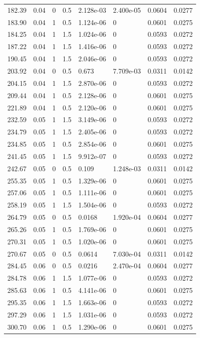 \documentclass[preview]{standalone}
\begin{document}
{{\begin{tabular}{L{1.2cm}C{1.2cm} C{0.3cm}C{0.5cm} C{1.4cm}C{1.4cm} C{1.4cm}C{1.4cm}}
  182.39  &  0.04  & 0     & 0.5 &  2.128e-03  & 2.400e-05  & 0.0604 &  0.0277   \\ 
  183.90  &  0.04  & 1     & 0.5 &  1.124e-06  & 0  & 0.0601 &  0.0275   \\ 
  184.25  &  0.04  & 1     & 1.5 &  1.024e-06  & 0  & 0.0593 &  0.0272   \\ 
  187.22  &  0.04  & 1     & 1.5 &  1.416e-06  & 0  & 0.0593 &  0.0272   \\ 
  190.45  &  0.04  & 1     & 1.5 &  2.046e-06  & 0  & 0.0593 &  0.0272   \\ 
  203.92  &  0.04  & 0     & 0.5 &  0.673  & 7.709e-03  & 0.0311 &  0.0142   \\ 
  204.15  &  0.04  & 1     & 1.5 &  2.870e-06  & 0  & 0.0593 &  0.0272   \\ 
  209.44  &  0.04  & 1     & 0.5 &  2.128e-06  & 0  & 0.0601 &  0.0275   \\ 
  221.89  &  0.04  & 1     & 0.5 &  2.120e-06  & 0  & 0.0601 &  0.0275   \\ 
  232.59  &  0.05  & 1     & 1.5 &  3.149e-06  & 0  & 0.0593 &  0.0272   \\ 
  234.79  &  0.05  & 1     & 1.5 &  2.405e-06  & 0  & 0.0593 &  0.0272   \\ 
  234.85  &  0.05  & 1     & 0.5 &  2.854e-06  & 0  & 0.0601 &  0.0275   \\ 
  241.45  &  0.05  & 1     & 1.5 &  9.912e-07  & 0  & 0.0593 &  0.0272   \\ 
  242.67  &  0.05  & 0     & 0.5 &  0.109  & 1.248e-03  & 0.0311 &  0.0142   \\ 
  255.35  &  0.05  & 1     & 0.5 &  1.329e-06  & 0  & 0.0601 &  0.0275   \\ 
  257.06  &  0.05  & 1     & 0.5 &  1.111e-06  & 0  & 0.0601 &  0.0275   \\ 
  258.19  &  0.05  & 1     & 1.5 &  1.504e-06  & 0  & 0.0593 &  0.0272   \\ 
  264.79  &  0.05  & 0     & 0.5 &  0.0168  & 1.920e-04  & 0.0604 &  0.0277   \\ 
  265.26  &  0.05  & 1     & 0.5 &  1.769e-06  & 0  & 0.0601 &  0.0275   \\ 
  270.31  &  0.05  & 1     & 0.5 &  1.020e-06  & 0  & 0.0601 &  0.0275   \\ 
  270.67  &  0.05  & 0     & 0.5 &  0.0614  & 7.030e-04  & 0.0311 &  0.0142   \\ 
  284.45  &  0.06  & 0     & 0.5 &  0.0216  & 2.470e-04  & 0.0604 &  0.0277   \\ 
  284.78  &  0.06  & 1     & 1.5 &  1.077e-06  & 0  & 0.0593 &  0.0272   \\ 
  285.63  &  0.06  & 1     & 0.5 &  4.141e-06  & 0  & 0.0601 &  0.0275   \\ 
  295.35  &  0.06  & 1     & 1.5 &  1.663e-06  & 0  & 0.0593 &  0.0272   \\ 
  297.29  &  0.06  & 1     & 1.5 &  1.031e-06  & 0  & 0.0593 &  0.0272   \\ 
  300.70  &  0.06  & 1     & 0.5 &  1.290e-06  & 0  & 0.0601 &  0.0275   \\ 
\hline 
\end{tabular} 

}}
\end{document}
